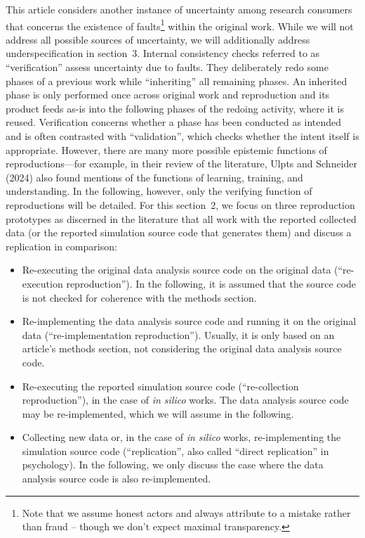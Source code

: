 \documentclass[authordate, empirical]{jote-new-article}
\begin{document}
	This article considers another instance of uncertainty among research consumers that concerns the existence of faults\footnote{ Note that we assume honest actors and always attribute to a mistake rather than fraud -- though we don't expect maximal transparency.} within the original work. While we will not address all possible sources of uncertainty, we will additionally address underspecification in section 3. Internal consistency checks referred to as “verification” assess uncertainty due to faults. They deliberately redo some phases of a previous work while “inheriting” all remaining phases. An inherited phase is only performed once across original work and reproduction and its product feeds as-is into the following phases of the redoing activity, where it is reused. Verification concerns whether a phase has been conducted as intended and is often contrasted with “validation”, which checks whether the intent itself is appropriate. However, there are many more possible epistemic functions of reproductions—for example, in their review of the literature, Ulpts and Schneider (2024) also found mentions of the functions of learning, training, and understanding. In the following, however, only the verifying function of reproductions will be detailed. For this section 2, we focus on three reproduction prototypes as discerned in the literature that all work with the reported collected data (or the reported simulation source code that generates them) and discuss a replication in comparison:

	\begin{itemize}


		\item Re-executing the original data analysis source code on the original data (“re-execution reproduction”). In the following, it is assumed that the source code is not checked for coherence with the methods section.



		\item
		Re-implementing the data analysis source code and running it on the original data (“re-implementation reproduction”). Usually, it is only based on an article's methods section, not considering the original data analysis source code.



		\item Re-executing the reported simulation source code (“re-collection reproduction”), in the case of \emph{in silico} works. The data analysis source code may be re-implemented, which we will assume in the following.



		\item Collecting new data or, in the case of \emph{in silico} works, re-implementing the simulation source code (“replication”, also called “direct replication” in psychology). In the following, we only discuss the case where the data analysis source code is also re-implemented.


	\end{itemize}
\end{document}
